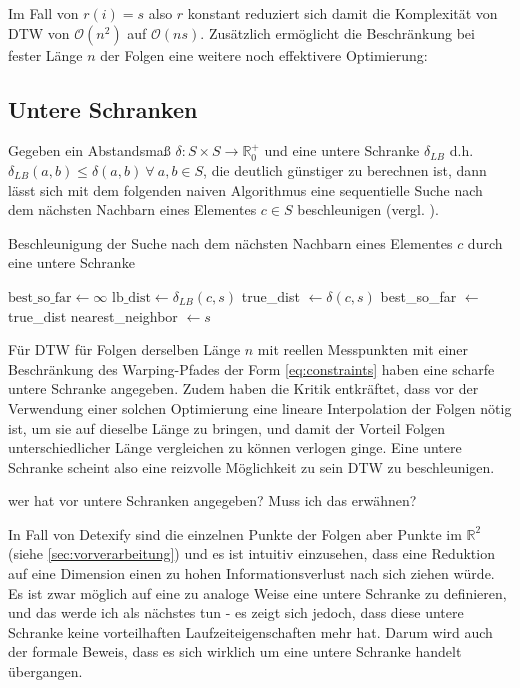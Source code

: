 Im Fall von \(r(i) = s\) also $r$ konstant reduziert sich damit die Komplexität von DTW von \( \mathcal{O}(n^2) \) auf \( \mathcal{O}(ns) \). Zusätzlich ermöglicht die Beschränkung bei fester Länge $n$ der Folgen eine weitere noch effektivere Optimierung:

\subsection{Untere Schranken} %
\label{sub:lower_bounding}

Gegeben ein Abstandsmaß \( \delta : S\times S \rightarrow \mathbb{R}_0^+ \) und eine untere Schranke \( \delta_{LB} \) d.h. \( \delta_{LB}(a,b) \leq \delta(a,b) ~\forall~ a,b \in S \), die deutlich günstiger zu berechnen ist, dann lässt sich mit dem folgenden naiven Algorithmus eine sequentielle Suche nach dem nächsten Nachbarn eines Elementes \( c \in S \) beschleunigen (vergl. \cite{Keogh:2005p7751}).

\begin{algorithm}
  \caption{Beschleunigung der Suche nach dem nächsten Nachbarn eines Elementes \(c\) durch eine untere Schranke}
  \begin{algorithmic}
    \STATE $\text{best\_so\_far} \gets \infty$
      \STATE $\text{lb\_dist} \gets \delta_{LB}(c,s)$
        \STATE true\_dist $\gets \delta(c,s)$
          \STATE best\_so\_far $\gets$ true\_dist
          \STATE nearest\_neighbor $\gets s$
        \ENDIF
      \ENDIF
    \ENDFOR
  \end{algorithmic}
\end{algorithm}

Für DTW für Folgen derselben Länge $n$ mit reellen Messpunkten mit einer Beschränkung des Warping-Pfades der Form \ref{eq:constraints} haben \citet{Keogh:2005p7751} eine scharfe untere Schranke angegeben. Zudem haben \citet{Ratanamahatana:2004p7522} die Kritik entkräftet, dass vor der Verwendung einer solchen Optimierung eine lineare Interpolation der Folgen nötig ist, um sie auf dieselbe Länge zu bringen, und damit der Vorteil Folgen unterschiedlicher Länge vergleichen zu können verlogen ginge. Eine untere Schranke scheint also eine reizvolle Möglichkeit zu sein DTW zu beschleunigen.

\TODO wer hat vor \citet{Keogh:2005p7751} untere Schranken angegeben? Muss ich das erwähnen?

In Fall von Detexify sind die einzelnen Punkte der Folgen aber Punkte im \( \mathbb{R}^2 \) (siehe \ref{sec:vorverarbeitung}) und es ist intuitiv einzusehen, dass eine Reduktion auf eine Dimension einen zu hohen Informationsverlust nach sich ziehen würde. Es ist zwar möglich auf eine zu \cite{Keogh:2005p7751} analoge Weise eine untere Schranke zu definieren, und das werde ich als nächstes tun - es zeigt sich jedoch, dass diese untere Schranke keine vorteilhaften Laufzeiteigenschaften mehr hat. Darum wird auch der formale Beweis, dass es sich wirklich um eine untere Schranke handelt übergangen.


